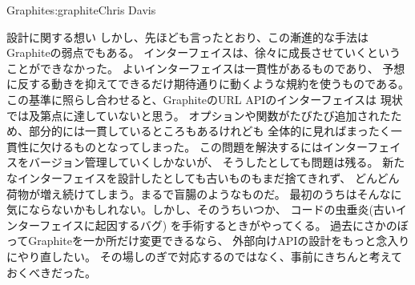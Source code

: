\begin{aosachapter}{Graphite}{s:graphite}{Chris Davis}
\begin{aosasect1}{設計に関する想い}
しかし、先ほども言ったとおり、この漸進的な手法はGraphiteの弱点でもある。
インターフェイスは、徐々に成長させていくということができなかった。
よいインターフェイスは一貫性があるものであり、
予想に反する動きを抑えてできるだけ期待通りに動くような規約を使うものである。
この基準に照らし合わせると、GraphiteのURL APIのインターフェイスは
現状では及第点に達していないと思う。
オプションや関数がたびたび追加されたため、部分的には一貫しているところもあるけれども
全体的に見ればまったく一貫性に欠けるものとなってしまった。
この問題を解決するにはインターフェイスをバージョン管理していくしかないが、
そうしたとしても問題は残る。
新たなインターフェイスを設計したとしても古いものもまだ捨てきれず、
どんどん荷物が増え続けてしまう。まるで盲腸のようなものだ。
最初のうちはそんなに気にならないかもしれない。しかし、そのうちいつか、
コードの虫垂炎(古いインターフェイスに起因するバグ)
を手術するときがやってくる。
過去にさかのぼってGraphiteを一か所だけ変更できるなら、
外部向けAPIの設計をもっと念入りにやり直したい。
その場しのぎで対応するのではなく、事前にきちんと考えておくべきだった。


\end{aosasect1}
\end{aosachapter}
